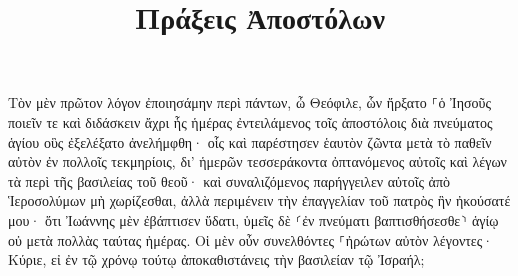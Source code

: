 \documentclass{openreader}
\title{Πράξεις Ἀποστόλων}
\date{}
\begin{document}
\maketitle
\raggedbottom 
\fontsize{16pt}{24pt}\selectfont


Τὸν μὲν πρῶτον λόγον ἐποιησάμην περὶ πάντων, ὦ Θεόφιλε, ὧν ἤρξατο ⸀ὁ Ἰησοῦς ποιεῖν τε καὶ διδάσκειν 
ἄχρι ἧς ἡμέρας ἐντειλάμενος τοῖς ἀποστόλοις διὰ πνεύματος ἁγίου οὓς ἐξελέξατο ἀνελήμφθη· 
οἷς καὶ παρέστησεν ἑαυτὸν ζῶντα μετὰ τὸ παθεῖν αὐτὸν ἐν πολλοῖς τεκμηρίοις, δι’ ἡμερῶν τεσσεράκοντα ὀπτανόμενος αὐτοῖς καὶ λέγων τὰ περὶ τῆς βασιλείας τοῦ θεοῦ· 
καὶ συναλιζόμενος παρήγγειλεν αὐτοῖς ἀπὸ Ἱεροσολύμων μὴ χωρίζεσθαι, ἀλλὰ περιμένειν τὴν ἐπαγγελίαν τοῦ πατρὸς ἣν ἠκούσατέ μου· 
ὅτι Ἰωάννης μὲν ἐβάπτισεν ὕδατι, ὑμεῖς δὲ ⸂ἐν πνεύματι βαπτισθήσεσθε⸃ ἁγίῳ οὐ μετὰ πολλὰς ταύτας ἡμέρας. 
Οἱ μὲν οὖν συνελθόντες ⸀ἠρώτων αὐτὸν λέγοντες· Κύριε, εἰ ἐν τῷ χρόνῳ τούτῳ ἀποκαθιστάνεις τὴν βασιλείαν τῷ Ἰσραήλ; 
\end{document}
